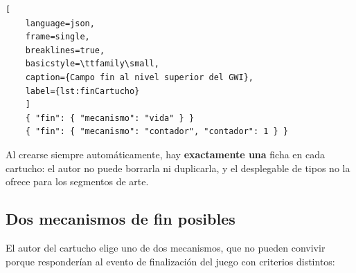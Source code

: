 \begin{lstlisting}[
	language=json,
	frame=single,
	breaklines=true,
	basicstyle=\ttfamily\small,
	caption={Campo fin al nivel superior del GWI},
	label={lst:finCartucho}
	]
	{ "fin": { "mecanismo": "vida" } }
	{ "fin": { "mecanismo": "contador", "contador": 1 } }
\end{lstlisting}

Al crearse siempre automáticamente, hay \textbf{exactamente una} ficha en cada
cartucho: el autor no puede borrarla ni duplicarla, y el desplegable de tipos
no la ofrece para los segmentos de arte.

\subsection{Dos mecanismos de fin posibles}
\label{subsec:MecanismosFinF3I11}

El autor del cartucho elige uno de dos mecanismos, que no pueden convivir porque responderían al evento de finalización del juego con criterios distintos:

